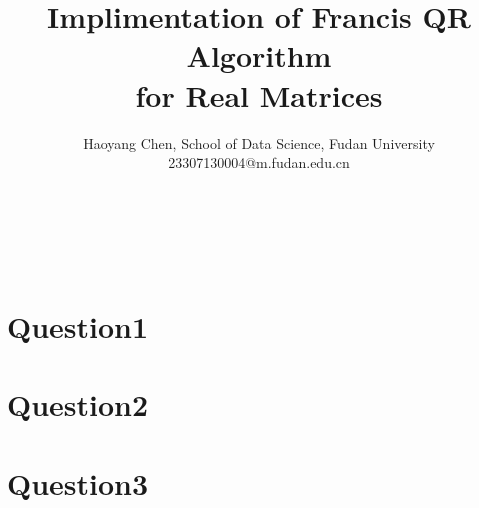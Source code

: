 \documentclass[12pt, a4paper]{ctexart}
\title{Implimentation of Francis QR Algorithm \\ for Real Matrices}
\author{Haoyang Chen, School of Data Science, Fudan University 
    \\ 23307130004@m.fudan.edu.cn}
\date{} %
\makeatletter
\def\maketitle{
  \begin{center} %
    \begin{flushleft} %
    {\LARGE \textbf{\@title}}\\[1em] %
    {\large \@author}\\[1em] %
    \end{flushleft}
  \end{center}
}
\makeatother
\begin{document}
\maketitle

\section{Question1}



\section{Question2}


\section{Question3}


% 
\end{document}
